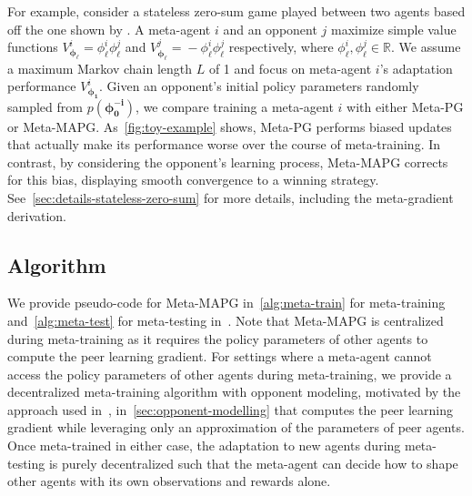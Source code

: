 For example, consider a stateless zero-sum game played between two agents based off the one shown by \citet{letcher2018stable}.
A meta-agent $i$ and an opponent $j$ maximize simple value functions $V^{i}_{\bm{\phi}_{\bm{\ell}}}\!=\!\phi^{i}_{\ell}\phi^{j}_{\ell}$ and $V^{j}_{\bm{\phi}_{\bm{\ell}}}\!=\!-\phi^{i}_{\ell}\phi^{j}_{\ell}$ respectively, where $\phi^{i}_{\ell},\phi^{j}_{\ell}\!\in\!\mathbb{R}$. 
We assume a maximum Markov chain length $L$ of 1 and focus on meta-agent $i$'s adaptation performance $V^{i}_{\bm{\phi}_{\bm{1}}}$. 
Given an opponent's initial policy parameters randomly sampled from $p(\bm{\phi}^{\bm{-i}}_{\bm{0}})$, we compare training a meta-agent $i$ with either Meta-PG or Meta-MAPG.
As~\cref{fig:toy-example} shows, Meta-PG performs biased updates that actually make its performance worse over the course of meta-training. 
In contrast, by considering the opponent's learning process, Meta-MAPG corrects for this bias, displaying smooth convergence to a winning strategy.
See~\cref{sec:details-stateless-zero-sum} for more details, including the meta-gradient derivation.

\subsection{Algorithm}
We provide pseudo-code for Meta-MAPG in~\cref{alg:meta-train} for meta-training and~\cref{alg:meta-test} for meta-testing in~.
Note that Meta-MAPG is centralized during meta-training as it requires the policy parameters of other agents to compute the peer learning gradient. 
For settings where a meta-agent cannot access the policy parameters of other agents during meta-training, we provide a decentralized meta-training algorithm with opponent modeling, motivated by the approach used in~\citet{foerster17lola}, in~\cref{sec:opponent-modelling} that computes the peer learning gradient while leveraging only an approximation of the parameters of peer agents.
Once meta-trained in either case, the adaptation to new agents during meta-testing is purely decentralized such that the meta-agent can decide how to shape other agents with its own observations and rewards alone. 